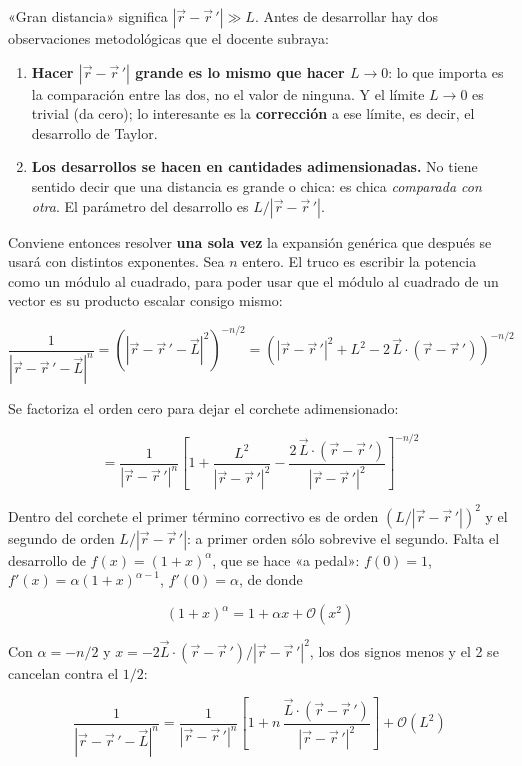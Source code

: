 \documentclass[12pt,a4paper]{article}
\begin{document}
«Gran distancia» significa $|\vec r - \vec r\,'| \gg L$. Antes de desarrollar hay
dos observaciones metodológicas que el docente subraya:

\begin{enumerate}[leftmargin=*]
  \item \textbf{Hacer $|\vec r - \vec r\,'|$ grande es lo mismo que hacer
        $L\to 0$}: lo que importa es la comparación entre las dos, no el valor de
        ninguna. Y el límite $L\to 0$ es trivial (da cero); lo interesante es la
        \textbf{corrección} a ese límite, es decir, el desarrollo de Taylor.
  \item \textbf{Los desarrollos se hacen en cantidades adimensionadas.} No tiene
        sentido decir que una distancia es grande o chica: es chica
        \emph{comparada con otra}. El parámetro del desarrollo es
        $L/|\vec r - \vec r\,'|$.
\end{enumerate}

Conviene entonces resolver \textbf{una sola vez} la expansión genérica que
después se usará con distintos exponentes. Sea $n$ entero. El truco es escribir
la potencia como un módulo al cuadrado, para poder usar que el módulo al cuadrado
de un vector es su producto escalar consigo mismo:

\[
\frac{1}{|\vec r - \vec r\,' - \vec L|^{n}}
= \left(|\vec r - \vec r\,' - \vec L|^2\right)^{-n/2}
= \left(|\vec r - \vec r\,'|^2 + L^2 - 2\,\vec L\cdot(\vec r - \vec r\,')\right)^{-n/2}
\]

Se factoriza el orden cero para dejar el corchete adimensionado:

\[
= \frac{1}{|\vec r - \vec r\,'|^{n}}
\left[1 + \frac{L^2}{|\vec r - \vec r\,'|^2}
        - \frac{2\,\vec L\cdot(\vec r - \vec r\,')}{|\vec r - \vec r\,'|^2}\right]^{-n/2}
\]

Dentro del corchete el primer término correctivo es de orden
$(L/|\vec r-\vec r\,'|)^2$ y el segundo de orden $L/|\vec r-\vec r\,'|$: a primer
orden sólo sobrevive el segundo. Falta el desarrollo de $f(x) = (1+x)^\alpha$, que
se hace «a pedal»: $f(0)=1$, $f'(x) = \alpha(1+x)^{\alpha-1}$, $f'(0)=\alpha$, de
donde

\[
(1+x)^{\alpha} = 1 + \alpha x + \mathcal{O}(x^2)
\]

Con $\alpha = -n/2$ y
$x = -2\vec L\cdot(\vec r-\vec r\,')/|\vec r-\vec r\,'|^2$, los dos signos menos y
el 2 se cancelan contra el $1/2$:

\[
\boxed{\;\frac{1}{|\vec r - \vec r\,' - \vec L|^{n}}
= \frac{1}{|\vec r - \vec r\,'|^{n}}
  \left[1 + n\,\frac{\vec L\cdot(\vec r - \vec r\,')}{|\vec r - \vec r\,'|^{2}}\right]
  + \mathcal{O}(L^2)\;}
\]
\end{document}
